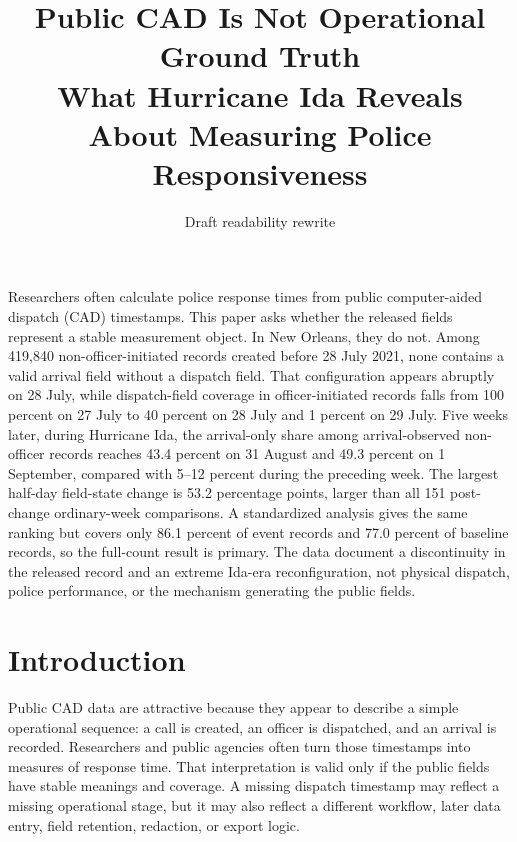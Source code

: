 \documentclass[11pt]{article}
\title{\vspace{-1.7em}\textbf{Public CAD Is Not Operational Ground Truth}\\[0.35em]
\large What Hurricane Ida Reveals About Measuring Police Responsiveness}
\author{}
\date{Draft readability rewrite}
\begin{document}
\maketitle
\thispagestyle{plain}
\vspace{-1.3em}

\begin{plainbox}[title=Abstract]
Researchers often calculate police response times from public computer-aided dispatch (CAD) timestamps. This paper asks whether the released fields represent a stable measurement object. In New Orleans, they do not. Among 419,840 non-officer-initiated records created before 28 July 2021, none contains a valid arrival field without a dispatch field. That configuration appears abruptly on 28 July, while dispatch-field coverage in officer-initiated records falls from 100 percent on 27 July to 40 percent on 28 July and 1 percent on 29 July. Five weeks later, during Hurricane Ida, the arrival-only share among arrival-observed non-officer records reaches 43.4 percent on 31 August and 49.3 percent on 1 September, compared with 5--12 percent during the preceding week. The largest half-day field-state change is 53.2 percentage points, larger than all 151 post-change ordinary-week comparisons. A standardized analysis gives the same ranking but covers only 86.1 percent of event records and 77.0 percent of baseline records, so the full-count result is primary. The data document a discontinuity in the released record and an extreme Ida-era reconfiguration, not physical dispatch, police performance, or the mechanism generating the public fields.
\end{plainbox}


\section{Introduction}

Public CAD data are attractive because they appear to describe a simple operational sequence: a call is created, an officer is dispatched, and an arrival is recorded. Researchers and public agencies often turn those timestamps into measures of response time. That interpretation is valid only if the public fields have stable meanings and coverage. A missing dispatch timestamp may reflect a missing operational stage, but it may also reflect a different workflow, later data entry, field retention, redaction, or export logic.
\end{document}
